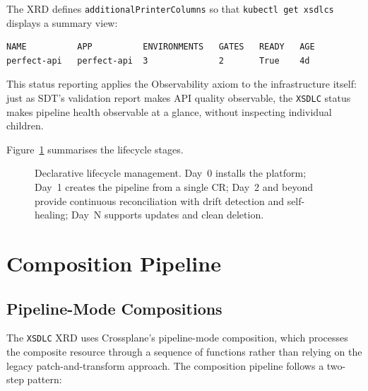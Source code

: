 The XRD defines \texttt{additionalPrinterColumns} so that \texttt{kubectl get xsdlcs} displays a summary view:

\begin{verbatim}
NAME          APP          ENVIRONMENTS   GATES   READY   AGE
perfect-api   perfect-api  3              2       True    4d
\end{verbatim}

This status reporting applies the Observability axiom to the infrastructure itself: just as SDT's validation report makes API quality observable, the \texttt{XSDLC} status makes pipeline health observable at a glance, without inspecting individual children.

Figure~\ref{fig:declarative-lifecycle} summarises the lifecycle stages.

\begin{figure}[htbp]
\centering
\resizebox{\textwidth}{!}{%
%
}
\caption{Declarative lifecycle management. Day~0 installs the platform; Day~1 creates the pipeline from a single CR; Day~2 and beyond provide continuous reconciliation with drift detection and self-healing; Day~N supports updates and clean deletion.}
\label{fig:declarative-lifecycle}
\end{figure}

\section{Composition Pipeline}
\label{sec:composition-pipeline}

\subsection{Pipeline-Mode Compositions}
\label{subsec:pipeline-mode}

The \texttt{XSDLC} XRD uses Crossplane's pipeline-mode composition, which processes the composite resource through a sequence of functions rather than relying on the legacy patch-and-transform approach. The composition pipeline follows a two-step pattern:


